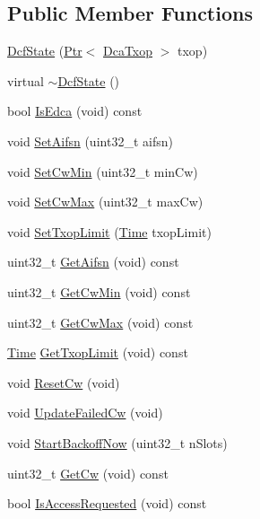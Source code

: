 \subsection*{Public Member Functions}
\begin{DoxyCompactItemize}
\item 
\hyperlink{classns3_1_1DcfState_a88e07577ce33c72b0a588e9cf6107fe0}{Dcf\+State} (\hyperlink{classns3_1_1Ptr}{Ptr}$<$ \hyperlink{classns3_1_1DcaTxop}{Dca\+Txop} $>$ txop)
\item 
virtual \hyperlink{classns3_1_1DcfState_a83411c126f34c99137cb1bc662ca0b77}{$\sim$\+Dcf\+State} ()
\item 
bool \hyperlink{classns3_1_1DcfState_a850a3c673f0af61d0a5276a48db94eb7}{Is\+Edca} (void) const 
\item 
void \hyperlink{classns3_1_1DcfState_ae957a4ab4e518d5efd50bb8640dd07c5}{Set\+Aifsn} (uint32\+\_\+t aifsn)
\item 
void \hyperlink{classns3_1_1DcfState_a9524cd3abcf31370ba118910f18bbd3b}{Set\+Cw\+Min} (uint32\+\_\+t min\+Cw)
\item 
void \hyperlink{classns3_1_1DcfState_aabe3bd9725e93eafe65901e409b0b8ab}{Set\+Cw\+Max} (uint32\+\_\+t max\+Cw)
\item 
void \hyperlink{classns3_1_1DcfState_a41b53a62910297dd47dcf13f8ae023bc}{Set\+Txop\+Limit} (\hyperlink{classns3_1_1Time}{Time} txop\+Limit)
\item 
uint32\+\_\+t \hyperlink{classns3_1_1DcfState_ad33189714372036a6bfee6c3dfc1bacb}{Get\+Aifsn} (void) const 
\item 
uint32\+\_\+t \hyperlink{classns3_1_1DcfState_a37bc0186a02944211154d1792f9c8acf}{Get\+Cw\+Min} (void) const 
\item 
uint32\+\_\+t \hyperlink{classns3_1_1DcfState_ab18d35dfb68b94341e73bc4e97cdb6e8}{Get\+Cw\+Max} (void) const 
\item 
\hyperlink{classns3_1_1Time}{Time} \hyperlink{classns3_1_1DcfState_a12990c816a66d163a9ab86fc1e2d1b8a}{Get\+Txop\+Limit} (void) const 
\item 
void \hyperlink{classns3_1_1DcfState_ad40c89a598811d9dc88d6270b9d21e4f}{Reset\+Cw} (void)
\item 
void \hyperlink{classns3_1_1DcfState_ac8c3e07b4e1e33badb18642f489b712e}{Update\+Failed\+Cw} (void)
\item 
void \hyperlink{classns3_1_1DcfState_a687e3238b35778b630557bf0e1636dba}{Start\+Backoff\+Now} (uint32\+\_\+t n\+Slots)
\item 
uint32\+\_\+t \hyperlink{classns3_1_1DcfState_a52aa14ed91f6ea7b137c4cd6cc2cd6ee}{Get\+Cw} (void) const 
\item 
bool \hyperlink{classns3_1_1DcfState_a1a9959645698b0f3d65902b0e382cfa2}{Is\+Access\+Requested} (void) const 
\end{DoxyCompactItemize}
